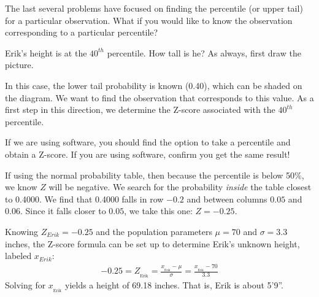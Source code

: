 The last several problems have focused on finding the
percentile (or upper tail) for a particular observation.
What if you would like to know the observation corresponding
to a particular percentile?

\begin{examplewrap}
\begin{nexample}{Erik's height is at the $40^{th}$ percentile.
    How tall is he?}\label{normalExam40Perc}
  As always, first draw the picture.\vspace{-4mm}
  \begin{center}
  \vspace{-1mm}
  \end{center}
  In this case, the lower tail probability is known (0.40),
  which can be shaded on the diagram.
  We want to find the observation that corresponds to this value.
  As a first step in this direction, we determine the Z-score
  associated with the $40^{th}$ percentile.

  If we are using software, you should find the option to
  take a percentile and obtain a Z-score.
  If you are using software, confirm you get the same result!

  If using the normal probability table, then because the
  percentile is below 50\%, we know $Z$ will be negative.
  We search for the probability \emph{inside} the table
  closest to 0.4000.
  We find that 0.4000 falls in row $-0.2$ and between columns
  $0.05$ and $0.06$.
  Since it falls closer to $0.05$, we take this one: $Z=-0.25$.

  Knowing $Z_{Erik}=-0.25$ and the population parameters
  $\mu=70$ and $\sigma=3.3$ inches, the Z-score formula can be
  set up to determine Erik's unknown height, labeled $x_{Erik}$:
  \begin{align*}
  -0.25
    = Z_{_{\text{Erik}}}
    = \frac{x_{_{\text{Erik}}} - \mu}{\sigma}
    = \frac{x_{_{\text{Erik}}} - 70}{3.3}
  \end{align*}
  Solving for $x_{_{\text{Erik}}}$ yields a height of 69.18 inches.
  That is, Erik is about 5'9''.
\end{nexample}
\end{examplewrap}

